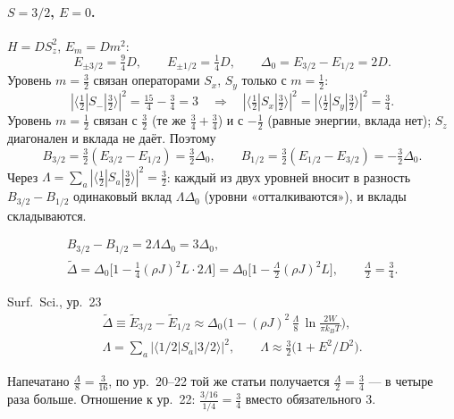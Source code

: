 \paragraph{$S=3/2$, $E=0$.} $H=DS_z^2$, $E_m=Dm^2$:
\[
E_{\pm3/2}=\tfrac94D,\qquad E_{\pm1/2}=\tfrac14D,\qquad \Delta_0=E_{3/2}-E_{1/2}=2D .
\]
Уровень $m=\tfrac32$ связан операторами $S_x$, $S_y$ только с $m=\tfrac12$:
\[
|\langle\tfrac12|S_-|\tfrac32\rangle|^2=\tfrac{15}4-\tfrac34=3\quad\Rightarrow\quad
|\langle\tfrac12|S_x|\tfrac32\rangle|^2=|\langle\tfrac12|S_y|\tfrac32\rangle|^2=\tfrac34 .
\]
Уровень $m=\tfrac12$ связан с $\tfrac32$ (те же $\tfrac34+\tfrac34$) и с $-\tfrac12$ (равные энергии,
вклада нет); $S_z$ диагонален и вклада не даёт. Поэтому
\[
B_{3/2}=\tfrac32(E_{3/2}-E_{1/2})=\tfrac32\Delta_0,\qquad
B_{1/2}=\tfrac32(E_{1/2}-E_{3/2})=-\tfrac32\Delta_0 .
\]
Через $\Lambda=\sum_a|\langle\tfrac12|S_a|\tfrac32\rangle|^2=\tfrac32$: каждый из двух уровней вносит в
разность $B_{3/2}-B_{1/2}$ одинаковый вклад $\Lambda\Delta_0$ (уровни «отталкиваются»), и
вклады складываются.
\begin{resbox}[Сдвиг перехода $S=3/2$, нормировка Surf.\ Sci.]
\begin{gather*}
B_{3/2}-B_{1/2}=2\Lambda\Delta_0=3\Delta_0,\\
\tilde\Delta=\Delta_0\Big[1-\tfrac14(\rho J)^2L\cdot2\Lambda\Big]
=\Delta_0\Big[1-\frac{\Lambda}{2}(\rho J)^2L\Big],\qquad \frac\Lambda2=\frac34 .
\end{gather*}
\end{resbox}
\begin{paperbox}{Surf.\ Sci., ур.~23}
\begin{gather*}
\tilde\Delta\equiv\tilde E_{3/2}-\tilde E_{1/2}\approx\Delta_0\Big(1-(\rho J)^2\,\frac\Lambda8\,\ln\frac{2W}{\pi k_BT}\Big),\\
\Lambda=\sum_a|\langle1/2|S_a|3/2\rangle|^2,\qquad \Lambda\approx\tfrac32\big(1+E^2/D^2\big).
\end{gather*}
\end{paperbox}
\begin{cmpbox}
Напечатано $\tfrac\Lambda8=\tfrac3{16}$, по ур.~20--22 той же статьи получается $\tfrac\Lambda2=\tfrac34$ ---
в четыре раза больше. Отношение к ур.~22: $\tfrac{3/16}{1/4}=\tfrac34$ вместо
обязательного 3.
\end{cmpbox}

